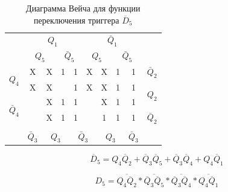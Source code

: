 \documentclass[a4paper,14pt]{article}
\begin{document}
\begin{table}[H]
	\begin{center}
		\caption{\label{tab:unD5_tab} Диаграмма Вейча для функции переключения триггера $\overline{D}_5$ }
\begin{tabular}{cccccccccc}
	& \multicolumn{4}{c}{$Q_1$} & \multicolumn{4}{c}{$\bar{Q}_1$} &  \\
	& \multicolumn{2}{c}{$Q_5$} & \multicolumn{2}{c}{$\bar{Q}_5$} & \multicolumn{2}{c}{$Q_5$} & \multicolumn{2}{c}{$\bar{Q}_5$} &  \\ \cline{2-9}
	\multicolumn{1}{c|}{\multirow{2}{*}{$Q_4$}} & \multicolumn{1}{c|}{X} & \multicolumn{1}{c|}{X} & \multicolumn{1}{c|}{1} & \multicolumn{1}{c|}{1} & \multicolumn{1}{c|}{X} & \multicolumn{1}{c|}{X} & \multicolumn{1}{c|}{1} & \multicolumn{1}{c|}{1} & $\bar{Q}_2$ \\ \cline{2-9}
	\multicolumn{1}{c|}{} & \multicolumn{1}{c|}{X} & \multicolumn{1}{c|}{X} & \multicolumn{1}{c|}{} & \multicolumn{1}{c|}{1} & \multicolumn{1}{c|}{X} & \multicolumn{1}{c|}{X} & \multicolumn{1}{c|}{1} & \multicolumn{1}{c|}{1} & \multirow{2}{*}{$Q_2$} \\ \cline{2-9}
	\multicolumn{1}{c|}{\multirow{2}{*}{$\bar{Q}_4$}} & \multicolumn{1}{c|}{} & \multicolumn{1}{c|}{X} & \multicolumn{1}{c|}{1} & \multicolumn{1}{c|}{1} & \multicolumn{1}{c|}{} & \multicolumn{1}{c|}{X} & \multicolumn{1}{c|}{1} & \multicolumn{1}{c|}{1} &  \\ \cline{2-9}
	\multicolumn{1}{c|}{} & \multicolumn{1}{c|}{} & \multicolumn{1}{c|}{X} & \multicolumn{1}{c|}{1} & \multicolumn{1}{c|}{1} & \multicolumn{1}{c|}{} & \multicolumn{1}{c|}{1} & \multicolumn{1}{c|}{1} & \multicolumn{1}{c|}{1} & $\bar{Q}_2$ \\ \cline{2-9}
	&  & \multicolumn{2}{c}{} & \multicolumn{2}{c}{} & \multicolumn{2}{c}{} &  &  \\
	& $\bar{Q}_3$ & \multicolumn{2}{c}{$Q_3$} & \multicolumn{2}{c}{$\bar{Q}_3$} & \multicolumn{2}{c}{$Q_3$} & $\bar{Q}_3$ & 
\end{tabular}
	\end{center}
\end{table}

$$\overline{D}_5 = Q_4\overline{Q}_2 + \overline{Q}_3\overline{Q}_5 + \overline{Q}_3\overline{Q}_4 + Q_4\overline{Q}_1$$

$$D_5 = \overline{Q_4\overline{Q}_2} * \overline{\overline{Q}_3\overline{Q}_5} * \overline{\overline{Q}_3\overline{Q}_4} * \overline{Q_4\overline{Q}_1}$$


\end{document}
